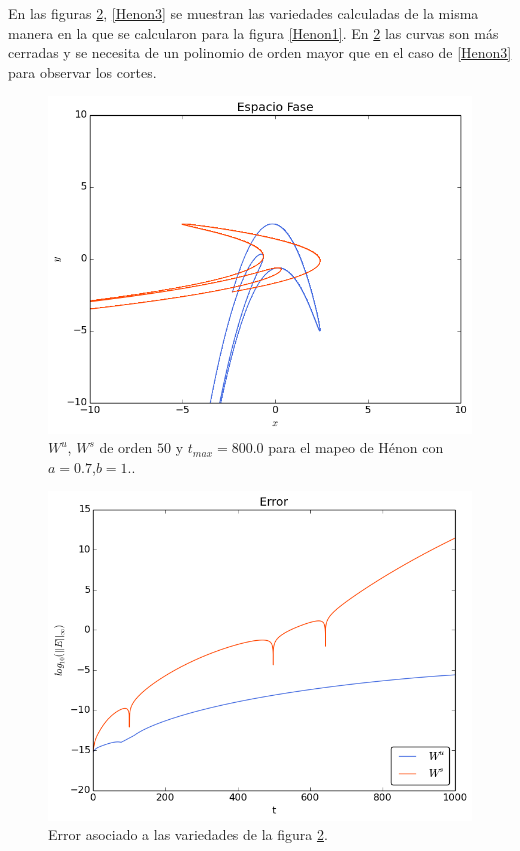 En las figuras \ref{Henon2}, \ref{Henon3} se muestran las variedades calculadas de la misma manera en la que se calcularon para la figura \ref{Henon1}. En \ref{Henon2} las curvas son más cerradas y se necesita de un polinomio de orden mayor que en el caso de \ref{Henon3} para observar los cortes. 
\begin{figure}[H]
\centering
\includegraphics[scale=0.6]{henon2}
\caption{$W^{u}$, $W^{s}$ de orden $50$ y $t_{max}=800.0$ para el mapeo de Hénon con $a=0.7$,$b=1.$.}
\label{Henon2}
\end{figure}

\begin{figure}[H]
\centering
\includegraphics[scale=0.6]{ErrorHenon2}
\caption{Error asociado a las variedades de la figura \ref{Henon2}.}
\label{Henon2}
\end{figure}


